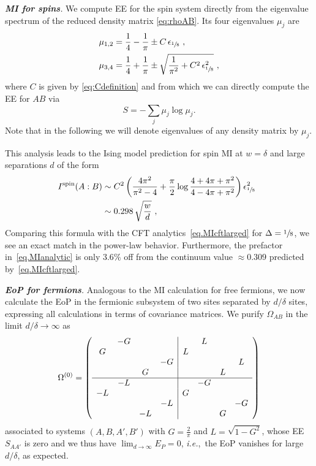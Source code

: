 \documentclass[prl,a4paper,notitlepage,twocolumn,superscriptaddress,longbibliography,reprint]{revtex4-2}
\newcommand{\ie}{{\it i.e.},\ }
\newcommand{\mysection}[1]{{\vspace{10 pt}\noindent \emph{{\textbf{#1}}.}}}
\begin{document}
\mysection{MI for spins} 
We compute EE for the spin system directly from the eigenvalue spectrum of the reduced density matrix \eqref{eq:rhoAB}. Its four eigenvalues $\mu_j$ are
\begin{subequations}
\begin{align}\label{eq:EigenSpinRhoAB}
    \mu_{1,2} &= \frac{1}{4} - \frac{1}{\pi} \pm C \,\epsilon_{\sfrac{1}{8}} \ , \\
    \mu_{3,4} &= \frac{1}{4} + \frac{1}{\pi} \pm \sqrt{\frac{1}{\pi^2} + C^2 \, \epsilon_{\sfrac{1}{8}}^2}\ ,
\end{align}
\end{subequations}
where $C$ is given by \eqref{eq:Cdefinition} and from which we can directly compute the EE for $AB$ via
\begin{equation}
\label{eq.Smu}
S = - \sum_j \mu_j \log\mu_j.
\end{equation}
Note that in the following we will denote eigenvalues of any density matrix by $\mu_{j}$.

This analysis leads to the Ising model prediction for spin MI at $w=\delta$ and large separations $d$ of the form
\begin{align}
\label{eq.MIanalytic}
 \hspace{-2mm}   I^\text{spin}(A:B) &\sim 
 C^2 \left( \frac{4\pi^2}{\pi^2-4} + \frac{\pi}{2}\log\frac{4+4\pi+\pi^2}{4-4\pi+\pi^2} \right)  \epsilon_{\sfrac{1}{8}}^2 \nonumber\\
 &\sim 0.298\, \sqrt{\frac{w}{d}} \ ,
\end{align}
\normalsize
Comparing this formula with the CFT analytics~\eqref{eq.MIcftlarged} for $\Delta = \sfrac{1}{8}$, we see an exact match in the power-law behavior. Furthermore, the prefactor in~\eqref{eq.MIanalytic} is only $3.6\%$ off from the continuum value $\approx0.309$ predicted by~\eqref{eq.MIcftlarged}.

\mysection{EoP for fermions} Analogous to the MI calculation for free fermions, we now calculate the EoP in the fermionic subsystem of two sites separated by $d/\delta$ sites, expressing all calculations in terms of covariance matrices. We purify $\Omega_{AB}$ in the limit $d/\delta\to\infty$ as
\begin{align}
    \Omega^{(0)}=\left(\begin{array}{cccc|cccc}
      & -G & & &  & L& & \\
    G &    & & & L &  & &\\
      &  & & -G & & & & L\\
     &    & G & & &  & L&\\
     \hline
       & -L & & &  & -G& & \\
    -L &    & & & G & & &\\
      &  & & -L & & &  & -G\\
     &    & -L & & &  & G&\\
    \end{array}\right)
\end{align}
associated to systems $(A,B,A',B')$ with $G=\frac{2}{\pi}$ and $L=\sqrt{1-G^2}$, whose EE $S_{AA'}$ is zero and we thus have $\lim_{d\to\infty}E_P=0$, \ie the EoP vanishes for large $d/\delta$, as expected.
\end{document}
